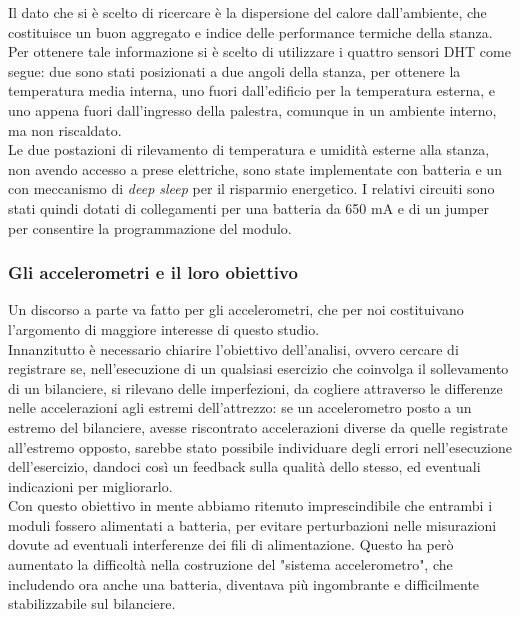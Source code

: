 \documentclass[fleqn,10pt]{SelfArx} %
\begin{document}
Il dato che si è scelto di ricercare è la dispersione del calore dall'ambiente, che costituisce un buon aggregato e 
indice delle performance termiche della stanza.\\
Per ottenere tale informazione si è scelto di utilizzare i quattro sensori DHT come segue: due sono stati 
posizionati a due angoli della stanza, per ottenere la temperatura media interna, uno fuori dall'edificio per la 
temperatura esterna, e uno appena fuori dall'ingresso della palestra, comunque in un ambiente interno, ma non riscaldato.
\\
Le due postazioni di rilevamento di temperatura e umidità esterne alla stanza, non avendo accesso a prese elettriche, 
sono state implementate con batteria e un con meccanismo di \textit{deep sleep} per il risparmio energetico. 
I relativi circuiti sono stati quindi dotati di collegamenti per una batteria da 650 mA e di un jumper per consentire la 
programmazione del modulo.

\subsubsection{Gli accelerometri e il loro obiettivo}

Un discorso a parte va fatto per gli accelerometri, che per noi costituivano l'argomento di maggiore interesse 
di questo studio.\\
Innanzitutto è necessario chiarire l'obiettivo dell'analisi, ovvero cercare di registrare 
se, nell'esecuzione di un qualsiasi esercizio che coinvolga il sollevamento di un bilanciere, si rilevano delle 
imperfezioni, da cogliere attraverso le differenze nelle accelerazioni agli estremi dell'attrezzo: se un accelerometro 
posto a un estremo del bilanciere, avesse riscontrato accelerazioni diverse da quelle registrate 
all'estremo opposto, sarebbe stato possibile individuare degli errori nell'esecuzione dell'esercizio, 
dandoci così un feedback sulla qualità dello stesso, ed eventuali indicazioni per migliorarlo.\\

Con questo obiettivo in mente abbiamo ritenuto imprescindibile che entrambi i moduli fossero alimentati a batteria, 
per evitare perturbazioni nelle misurazioni dovute ad eventuali interferenze dei fili di alimentazione. Questo ha però 
aumentato la difficoltà nella costruzione del "sistema accelerometro", che includendo ora anche una batteria, 
diventava più ingombrante e difficilmente stabilizzabile sul bilanciere.\\
\end{document}
